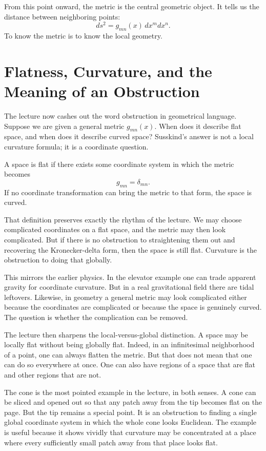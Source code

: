 From this point onward, the metric is the central geometric object. It tells us the distance between neighboring points:
\begin{equation}
ds^{2}=g_{mn}(x)\,dx^{m}dx^{n}.
\end{equation}
To know the metric is to know the local geometry.

\section{Flatness, Curvature, and the Meaning of an Obstruction}

The lecture now cashes out the word obstruction in geometrical language. Suppose we are given a general metric \(g_{mn}(x)\). When does it describe flat space, and when does it describe curved space? Susskind's answer is not a local curvature formula; it is a coordinate question.

\begin{definition}
A space is flat if there exists some coordinate system in which the metric becomes
\[
g_{mn}=\delta_{mn}.
\]
If no coordinate transformation can bring the metric to that form, the space is curved.
\end{definition}

That definition preserves exactly the rhythm of the lecture. We may choose complicated coordinates on a flat space, and the metric may then look complicated. But if there is no obstruction to straightening them out and recovering the Kronecker-delta form, then the space is still flat. Curvature is the obstruction to doing that globally.

This mirrors the earlier physics. In the elevator example one can trade apparent gravity for coordinate curvature. But in a real gravitational field there are tidal leftovers. Likewise, in geometry a general metric may look complicated either because the coordinates are complicated or because the space is genuinely curved. The question is whether the complication can be removed.

The lecture then sharpens the local-versus-global distinction. A space may be locally flat without being globally flat. Indeed, in an infinitesimal neighborhood of a point, one can always flatten the metric. But that does not mean that one can do so everywhere at once. One can also have regions of a space that are flat and other regions that are not.

The cone is the most pointed example in the lecture, in both senses. A cone can be sliced and opened out so that any patch away from the tip becomes flat on the page. But the tip remains a special point. It is an obstruction to finding a single global coordinate system in which the whole cone looks Euclidean. The example is useful because it shows vividly that curvature may be concentrated at a place where every sufficiently small patch away from that place looks flat.

